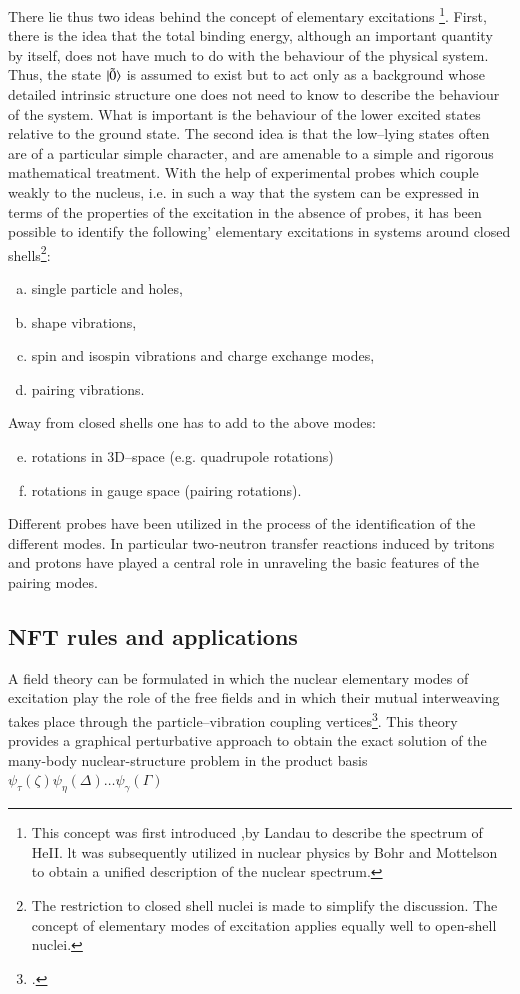 There lie thus two ideas behind the concept of elementary excitations \footnote{This concept was first introduced ,by Landau \citep{Landau:41} to describe the spectrum
of HeII. lt was subsequently utilized in nuclear physics by Bohr and Mottelson \cite{Bohr:69,Bohr:75}
to obtain a unified description of the nuclear spectrum.}.
First, there is the idea that the total binding energy, although an important quantity by itself, does not have much to do
with the behaviour of the physical system. Thus, the state $|{\tilde 0} \rangle$ is assumed to
exist but to act only as a background whose detailed intrinsic structure one does
not need to know to describe the behaviour of the system. What is important
is the behaviour of the lower excited states relative to the ground state.
The second idea is that the low--lying states often are of a particular simple
character, and are amenable to a simple and rigorous mathematical treatment.
With the help of experimental probes which couple weakly to the nucleus,
i.e. in such a way that the system can be expressed in terms of the properties
of the excitation in the absence of probes, it has been possible to identify the
following' elementary excitations in systems around closed shells\footnote{The restriction to closed shell nuclei is made to simplify the discussion. The concept
of elementary modes of excitation applies equally well to open-shell nuclei.}:
\begin{enumerate}[a)]
\item single particle and holes,
\item shape vibrations,
\item spin and isospin vibrations and charge exchange modes,
\item pairing vibrations.
\end{enumerate}
Away from closed shells one has to add to the above modes:
\begin{enumerate}[a)]
\setcounter{enumi}{4}
\item rotations in 3D--space (e.g. quadrupole rotations)
\item rotations in gauge space (pairing rotations).
\end{enumerate}
Different probes have been utilized in the process of the identification of the different modes. In particular two-neutron transfer reactions induced by tritons
and protons have played a central role in unraveling the basic features of the pairing modes. 
\subsection{NFT rules and applications}\label{Sect1.7.2}
A field theory can be formulated in which the nuclear elementary modes of
excitation play the role of the free fields and in which their mutual interweaving takes place through the particle--vibration coupling vertices\footnote{\cite{Bohr:75,Bes:74,Broglia:76}.}.
This theory provides a graphical perturbative approach to obtain the exact
solution of the many-body nuclear-structure problem in the product basis $\psi_\tau(\zeta)\psi_\eta(\Delta)\dots\psi_\gamma(\Gamma)$


